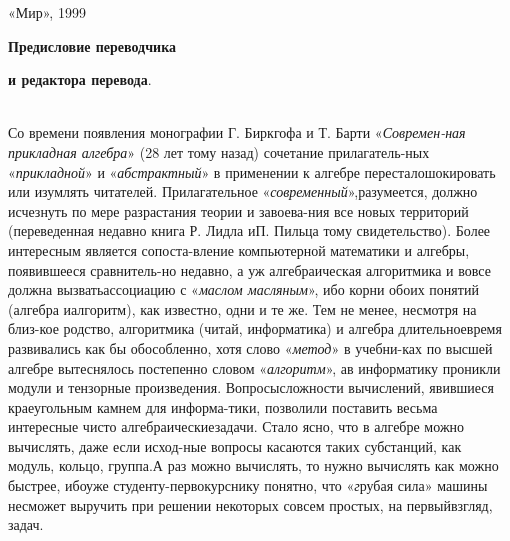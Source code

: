 \hspace{2.8in} «Мир», 1999
\newpage
\vspace*{50pt}
\hspace{2.0cm} {\Large \textbf {Предисловие переводчика}

\hspace{2.6cm} {\Large \textbf {и редактора перевода}.
\\\\

\noindent\normalsize {Со времени появления монографии Г. Биркгофа и Т. Барти «\textit {Современ-\linebreak ная прикладная алгебра}» (28 лет тому назад) сочетание прилагатель-\linebreak ных «\textit {прикладной}» и «\textit {абстрактный}» в применении к алгебре перестало\linebreak  шокировать или изумлять читателей. Прилагательное «\textit {современный}»,\linebreak разумеется, должно исчезнуть по мере разрастания теории и завоева-\linebreak ния все новых территорий (переведенная недавно книга Р. Лидла и\linebreak П. Пильца тому свидетельство). Более интересным является сопоста-\linebreak вление компьютерной математики и алгебры, появившееся сравнитель-\linebreak но недавно, а уж алгебраическая алгоритмика и вовсе должна вызвать\linebreak ассоциацию с «\textit {маслом масляным}», ибо корни обоих понятий (алгебра и\linebreak алгоритм), как известно, одни и те же. Тем не менее, несмотря на близ-\linebreak кое родство, алгоритмика (читай, информатика) и алгебра длительное\linebreak время развивались как бы обособленно, хотя слово «\textit {метод}» в учебни-\linebreak ках по высшей алгебре вытеснялось постепенно словом «\textit {алгоритм}», а\linebreak в информатику проникли модули и тензорные произведения. Вопросы\linebreak сложности вычислений, явившиеся краеугольным камнем для информа-\linebreak тики, позволили поставить весьма интересные чисто алгебраические\linebreak задачи. Стало ясно, что в алгебре можно вычислять, даже если исход-\linebreak ные вопросы касаются таких субстанций, как модуль, кольцо, группа.\linebreak А раз можно вычислять, то нужно вычислять как можно быстрее, ибо\linebreak уже студенту-первокурснику понятно, что «\textit грубая сила» машины не\linebreak сможет выручить при решении некоторых совсем простых, на первый\linebreak взгляд, задач.
    
}}}
